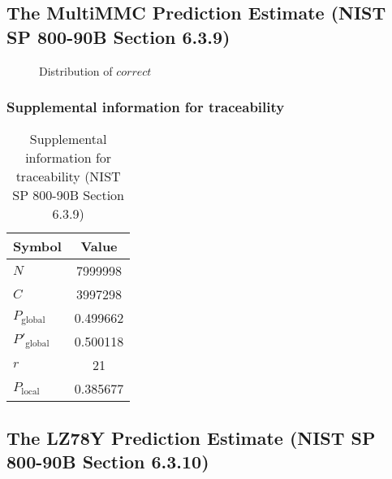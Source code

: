 \documentclass[a3paper,xelatex,english]{bxjsarticle}
\begin{document}
\subsection{The MultiMMC Prediction Estimate (NIST SP 800-90B Section 6.3.9)}\label{sec:Binary639}

\begin{figure}[htbp]
\centering

\caption{Distribution of $correct$}
\end{figure}
\subsubsection{Supplemental information for traceability}
\renewcommand{\arraystretch}{1.8}
\begin{table}[h]
\caption{Supplemental information for traceability (NIST SP 800-90B Section 6.3.9)}
\begin{center}
\begin{tabular}{|l|c|}
\hline 
\rowcolor{anotherlightblue} %
Symbol				& Value \\ \hline 
$N$				& 7999998\\ \hline 
$C$				& 3997298\\ \hline 
$P_{\textrm{global}}$				& 0.499662\\ \hline 
$P'_{\textrm{global}}$			& 0.500118\\ \hline 
$r$				& 21\\ \hline 
$P_{\textrm{local}}$ 			& 0.385677\\ \hline
\end{tabular}
\end{center}
\end{table}
\renewcommand{\arraystretch}{1.4}
\clearpage
\subsection{The LZ78Y Prediction Estimate (NIST SP 800-90B Section 6.3.10)}\label{sec:Binary6310}
\end{document}
